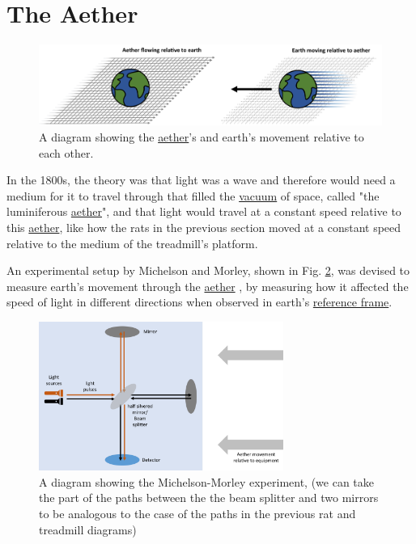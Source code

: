 \section{The Aether}%

\begin{figure}[ht]
	\centering
	\includegraphics[width=\textwidth]{images/pdf/earth_and_aether.pdf}
	\caption{A diagram showing the \protect\hyperlink{def-aether}{aether}'s and earth's movement relative to each other.}
	\label{fig: Aether}
\end{figure}

In the 1800s, the theory was that light was a wave and therefore would need a medium for it to travel through that filled the \hyperlink{def-vacuum}{vacuum} of space, called "the luminiferous \hyperlink{def-aether}{aether}", and that light would travel at a constant speed relative to this \hyperlink{def-aether}{aether}, like how the rats in the previous section moved at a constant speed relative to the medium of the treadmill's platform.

An experimental setup by Michelson and Morley, shown in Fig. \ref{fig: Michelson_morley}, was devised to measure earth's movement through the \hyperlink{def-aether}{aether} \cite{EtherExperiment}, by measuring how it affected the speed of light in different directions when observed in earth's \hyperlink{def-Reference-frame}{reference frame}.

\begin{figure}[H]
	\centering
	\includegraphics[width=8cm]{images/pdf/Michelson_morley.pdf}
	\caption{A diagram showing the Michelson-Morley experiment, (we can take the part of the paths between the the beam splitter and two mirrors to be analogous to the case of the paths in the previous rat and treadmill diagrams) }
	\label{fig: Michelson_morley}
\end{figure}

